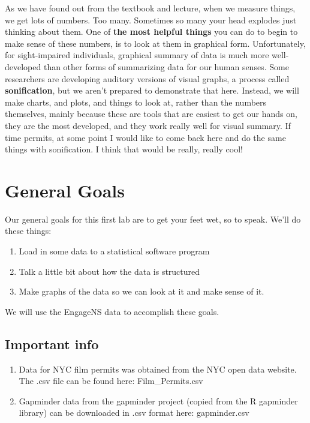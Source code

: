 \documentclass[
]{book}
\providecommand{\tightlist}{%
  \setlength{\itemsep}{0pt}\setlength{\parskip}{0pt}}
\begin{document}
As we have found out from the textbook and lecture, when we measure things, we get lots of numbers. Too many. Sometimes so many your head explodes just thinking about them. One of \textbf{the most helpful things} you can do to begin to make sense of these numbers, is to look at them in graphical form. Unfortunately, for sight-impaired individuals, graphical summary of data is much more well-developed than other forms of summarizing data for our human senses. Some researchers are developing auditory versions of visual graphs, a process called \textbf{sonification}, but we aren't prepared to demonstrate that here. Instead, we will make charts, and plots, and things to look at, rather than the numbers themselves, mainly because these are tools that are easiest to get our hands on, they are the most developed, and they work really well for visual summary. If time permits, at some point I would like to come back here and do the same things with sonification. I think that would be really, really cool!

\hypertarget{general-goals}{%
\section{General Goals}\label{general-goals}}

Our general goals for this first lab are to get your feet wet, so to speak. We'll do these things:

\begin{enumerate}
\def\labelenumi{\arabic{enumi}.}
\tightlist
\item
  Load in some data to a statistical software program
\item
  Talk a little bit about how the data is structured
\item
  Make graphs of the data so we can look at it and make sense of it.
\end{enumerate}

We will use the EngageNS data to accomplish these goals.

\hypertarget{important-info}{%
\subsection{Important info}\label{important-info}}

\begin{enumerate}
\def\labelenumi{\arabic{enumi}.}
\item
  Data for NYC film permits was obtained from the NYC open data website. The .csv file can be found here: Film\_Permits.csv
\item
  Gapminder data from the gapminder project (copied from the R gapminder library) can be downloaded in .csv format here: gapminder.csv
\end{enumerate}
\end{document}
